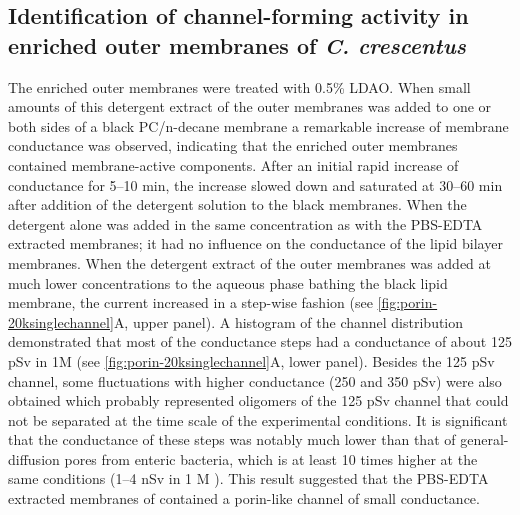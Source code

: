 \subsection{Identification of channel-forming activity in enriched outer membranes of \textit{C. crescentus}}
The enriched outer membranes were treated with 0.5\% \ac{LDAO}. When small amounts of this detergent extract of the outer membranes was added to one or both sides of a black \ac{PC}/n-decane membrane a remarkable increase of membrane conductance was observed, indicating that the enriched outer membranes contained membrane-active components. %
After an initial rapid increase of conductance for 5--10 min, the increase slowed down and saturated at 30--60 min after addition of the detergent solution to the black membranes. When the detergent alone was added in the same concentration as with the \ac{PBS}-\ac{EDTA} extracted membranes; it had no influence on the conductance of the lipid bilayer membranes. When the detergent extract of the outer membranes was added at much lower concentrations to the aqueous phase bathing the black lipid membrane, the current increased in a step-wise fashion (see \cref{fig:porin-20ksinglechannel}A, upper panel). A histogram of the channel distribution demonstrated that most of the conductance steps had a conductance of about 125 \si{\pico\sievert} in 1M  (see \cref{fig:porin-20ksinglechannel}A, lower panel). Besides the 125 \si{\pico\sievert} channel, some fluctuations with higher conductance (250 and 350 \si{\pico\sievert}) were also obtained which probably represented oligomers of the 125 \si{\pico\sievert} channel that could not be separated at the time scale of the experimental conditions. It is significant that the conductance of these steps was notably much lower than that of general-diffusion pores from enteric bacteria, which is at least 10 times higher at the same conditions (1--4 \si{\nano\sievert} in 1 M ). This result suggested that the \ac{PBS}-\ac{EDTA} extracted membranes of \caulobacter contained a porin-like channel of small conductance. 

